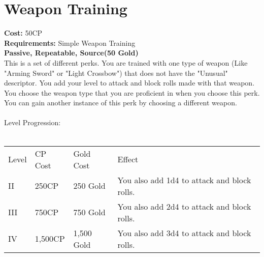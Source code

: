 \section{Weapon Training}\label{perk:weaponTraining}
\textbf{Cost:} 50CP\\
\textbf{Requirements:} Simple Weapon Training\\
\textbf{Passive, Repeatable, Source(50 Gold)}\\
This is a set of different perks.
You are trained with one type of weapon (Like "Arming Sword" or "Light Crossbow") that does not have the "Unusual" descriptor.
You add your level to attack and block rolls made with that weapon.\\
You choose the weapon type that you are proficient in when you choose this perk.
You can gain another instance of this perk by choosing a different weapon.\\
\\
Level Progression:\\
\\
\begin{tabular}{l | l | l | l}
	Level & CP Cost & Gold Cost & Effect\\
	II & 250CP & 250 Gold & You also add 1d4 to attack and block rolls.\\
	III & 750CP & 750 Gold & You also add 2d4 to attack and block rolls.\\
	IV & 1,500CP & 1,500 Gold & You also add 3d4 to attack and block rolls.\\
\end{tabular}